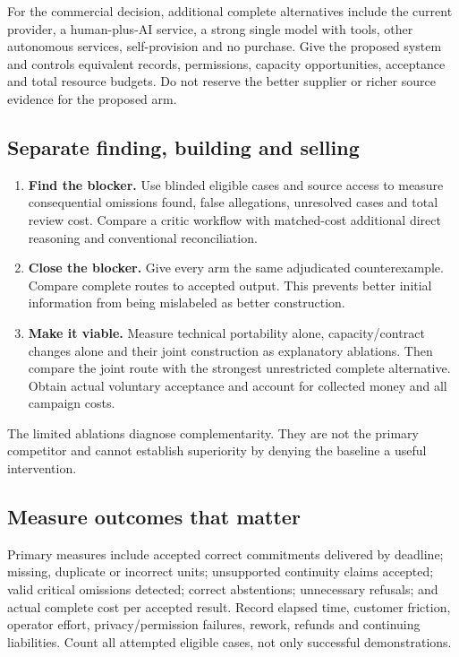 \documentclass[11pt,a4paper]{article}
\begin{document}
For the commercial decision, additional complete alternatives include the current provider, a human-plus-AI service, a strong single model with tools, other autonomous services, self-provision and no purchase. Give the proposed system and controls equivalent records, permissions, capacity opportunities, acceptance and total resource budgets. Do not reserve the better supplier or richer source evidence for the proposed arm.

\subsection{Separate finding, building and selling}
\begin{enumerate}
\item \textbf{Find the blocker.} Use blinded eligible cases and source access to measure consequential omissions found, false allegations, unresolved cases and total review cost. Compare a critic workflow with matched-cost additional direct reasoning and conventional reconciliation.
\item \textbf{Close the blocker.} Give every arm the same adjudicated counterexample. Compare complete routes to accepted output. This prevents better initial information from being mislabeled as better construction.
\item \textbf{Make it viable.} Measure technical portability alone, capacity/contract changes alone and their joint construction as explanatory ablations. Then compare the joint route with the strongest unrestricted complete alternative. Obtain actual voluntary acceptance and account for collected money and all campaign costs.
\end{enumerate}
The limited ablations diagnose complementarity. They are not the primary competitor and cannot establish superiority by denying the baseline a useful intervention.

\subsection{Measure outcomes that matter}
Primary measures include accepted correct commitments delivered by deadline; missing, duplicate or incorrect units; unsupported continuity claims accepted; valid critical omissions detected; correct abstentions; unnecessary refusals; and actual complete cost per accepted result. Record elapsed time, customer friction, operator effort, privacy/permission failures, rework, refunds and continuing liabilities. Count all attempted eligible cases, not only successful demonstrations.
\end{document}
